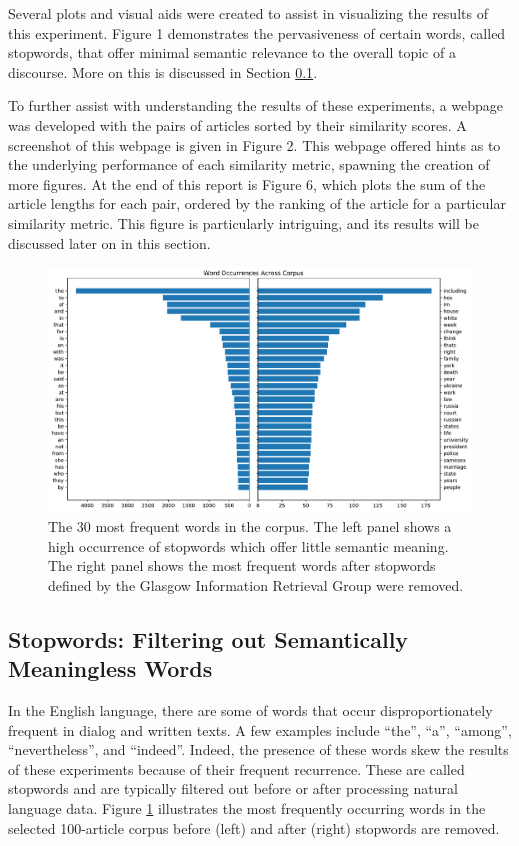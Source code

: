 \documentclass[11pt]{article}
\begin{document}
Several plots and visual aids were created to assist in visualizing the results of this experiment.
Figure 1 demonstrates the pervasiveness of certain words, called stopwords, that offer minimal semantic relevance to the overall topic of a discourse.
More on this is discussed in Section \ref{sec:stopwords}.

To further assist with understanding the results of these experiments, a webpage was developed with the pairs of articles sorted by their similarity scores.
A screenshot of this webpage is given in Figure 2.
This webpage offered hints as to the underlying performance of each similarity metric, spawning the creation of more figures.
At the end of this report is Figure 6, which plots the sum of the article lengths for each pair, ordered by the ranking of the article for a particular similarity metric.
This figure is particularly intriguing, and its results will be discussed later on in this section.


\begin{figure}[h] \label{fig:stopwords}
  \centering
  \includegraphics[width=\textwidth]{figures/stopwords}
  \caption{The 30 most frequent words in the corpus. The left panel shows a high occurrence of stopwords which offer little semantic meaning. The right panel shows the most frequent words after stopwords defined by the Glasgow Information Retrieval Group were removed.}
\end{figure}

\subsection{Stopwords: Filtering out Semantically Meaningless Words} \label{sec:stopwords}

In the English language, there are some of words that occur disproportionately frequent in dialog and written texts.
A few examples include ``the'', ``a'', ``among'', ``nevertheless'', and ``indeed''.
Indeed, the presence of these words skew the results of these experiments because of their frequent recurrence.
These are called stopwords and are typically filtered out before or after processing natural language data.
Figure \ref{fig:stopwords} illustrates the most frequently occurring words in the selected 100-article corpus before (left) and after (right) stopwords are removed.
\end{document}
